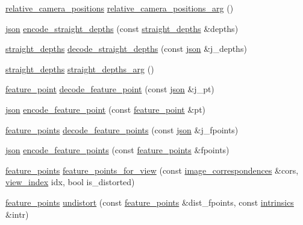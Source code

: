 \begin{DoxyCompactItemize}
\hyperlink{structtlz_1_1relative__camera__positions}{relative\+\_\+camera\+\_\+positions} \hyperlink{namespacetlz_a922b23e21d7b208319196b18bd9a3ea6}{relative\+\_\+camera\+\_\+positions\+\_\+arg} ()
\item 
\hyperlink{namespacetlz_ac400657dfcddf6309a769aefc23eed0c}{json} \hyperlink{namespacetlz_a37f6b5c348f5171c91d6eaf80374e40d}{encode\+\_\+straight\+\_\+depths} (const \hyperlink{namespacetlz_a392186cdaba07f801aec55b464ccbc0b}{straight\+\_\+depths} \&depths)
\item 
\hyperlink{namespacetlz_a392186cdaba07f801aec55b464ccbc0b}{straight\+\_\+depths} \hyperlink{namespacetlz_a18ebdbd3058b74f2195388d86343b21d}{decode\+\_\+straight\+\_\+depths} (const \hyperlink{namespacetlz_ac400657dfcddf6309a769aefc23eed0c}{json} \&j\+\_\+depths)
\item 
\hyperlink{namespacetlz_a392186cdaba07f801aec55b464ccbc0b}{straight\+\_\+depths} \hyperlink{namespacetlz_a13d1bcc21c6eb46a1226f7cf943fcf72}{straight\+\_\+depths\+\_\+arg} ()
\item 
\hyperlink{structtlz_1_1feature__point}{feature\+\_\+point} \hyperlink{namespacetlz_ae8f9175a86bbe49ac0f4485d5db3080b}{decode\+\_\+feature\+\_\+point} (const \hyperlink{namespacetlz_ac400657dfcddf6309a769aefc23eed0c}{json} \&j\+\_\+pt)
\item 
\hyperlink{namespacetlz_ac400657dfcddf6309a769aefc23eed0c}{json} \hyperlink{namespacetlz_a8f6c31dc4b1dffe7950bcb1f4ff85cbc}{encode\+\_\+feature\+\_\+point} (const \hyperlink{structtlz_1_1feature__point}{feature\+\_\+point} \&pt)
\item 
\hyperlink{structtlz_1_1feature__points}{feature\+\_\+points} \hyperlink{namespacetlz_abc92401653ee5627160c4f3c48a11311}{decode\+\_\+feature\+\_\+points} (const \hyperlink{namespacetlz_ac400657dfcddf6309a769aefc23eed0c}{json} \&j\+\_\+fpoints)
\item 
\hyperlink{namespacetlz_ac400657dfcddf6309a769aefc23eed0c}{json} \hyperlink{namespacetlz_a0b42822a3802ba98cfb8d42223b3149d}{encode\+\_\+feature\+\_\+points} (const \hyperlink{structtlz_1_1feature__points}{feature\+\_\+points} \&fpoints)
\item 
\hyperlink{structtlz_1_1feature__points}{feature\+\_\+points} \hyperlink{namespacetlz_abab56a7d5e8f6eba9520c66a15fafa6d}{feature\+\_\+points\+\_\+for\+\_\+view} (const \hyperlink{structtlz_1_1image__correspondences}{image\+\_\+correspondences} \&cors, \hyperlink{structtlz_1_1view__index}{view\+\_\+index} idx, bool is\+\_\+distorted)
\item 
\hyperlink{structtlz_1_1feature__points}{feature\+\_\+points} \hyperlink{namespacetlz_ae9eeca909bec8ca797356b56d3cfbb90}{undistort} (const \hyperlink{structtlz_1_1feature__points}{feature\+\_\+points} \&dist\+\_\+fpoints, const \hyperlink{structtlz_1_1intrinsics}{intrinsics} \&intr)

\end{DoxyCompactItemize}
